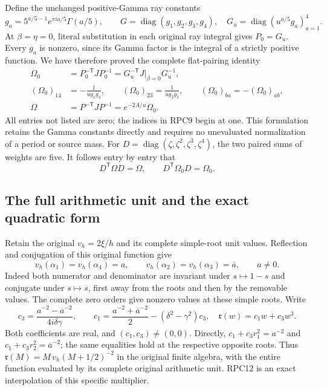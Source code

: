 \documentclass[11pt,a4paper]{article}
\begin{document}
Define the unchanged positive-Gamma ray constants
\[
 g_a=5^{a/5-1}e^{\pi ia/5}\Gamma(a/5),\qquad
 G=\operatorname{diag}(g_1,g_2,g_3,g_4),\quad
 G_u=\operatorname{diag}(u^{a/5}g_a)_{a=1}^4.
 \tag{RPC8}
\]
At $\beta=\eta=0$, literal substitution in each original ray integral
gives $P_0=G_u$. Every $g_a$ is nonzero, since its Gamma factor is
the integral of a strictly positive function. We have therefore proved
the complete flat-pairing identity
\[
 \begin{split}
 \Omega_0&=P_0^{-\mathsf T}JP_0^{-1}
       =G_u^{-\mathsf T}J\big|_{\beta=0}G_u^{-1},\\
 (\Omega_0)_{14}&=-\frac1{u g_1g_4},\qquad
 (\Omega_0)_{23}=\frac1{u g_2g_3},\qquad
 (\Omega_0)_{ba}=-(\Omega_0)_{ab},\\
 \Omega&=P^{-\mathsf T}JP^{-1}=e^{-2A/u}\Omega_0.
 \end{split}
 \tag{RPC9}
\]
All entries not listed are zero; the indices in RPC9 begin at one.
This formulation retains the Gamma constants directly and requires
no unevaluated normalization of a period or source mass. For
$D=\operatorname{diag}(\zeta,\zeta^2,\zeta^3,\zeta^4)$, the two
paired sums of weights are five. It follows entry by entry that
\[
 D^{\mathsf T}\Omega D=\Omega,
 \qquad D^{\mathsf T}\Omega_0D=\Omega_0.
 \tag{RPC10}
\]

\subsection{The full arithmetic unit and the exact quadratic form}

Retain the original $v_h=2\xi/h$ and its complete simple-root unit
values. Reflection and conjugation of this original function give
\[
 v_h(\alpha_1)=v_h(\alpha_4)=a,\qquad
 v_h(\alpha_2)=v_h(\alpha_3)=\overline a,\qquad a\ne0.
 \tag{RPC11}
\]
Indeed both numerator and denominator are invariant under $s\mapsto1-s$
and conjugate under $s\mapsto\overline s$, first away from the roots
and then by the removable values. The complete zero orders give
nonzero values at these simple roots. Write
\[
 c_3=\frac{a^{-2}-\overline a^{-2}}{4i\delta\gamma},\qquad
 c_1=\frac{a^{-2}+\overline a^{-2}}2-(\delta^2-\gamma^2)c_3,
 \quad \mathfrak r(w)=c_1w+c_3w^3.
 \tag{RPC12}
\]
Both coefficients are real, and $(c_1,c_3)\ne(0,0)$. Directly,
$c_1+c_3r_1^2=a^{-2}$ and $c_1+c_3r_2^2=\overline a^{-2}$;
the same equalities hold at the respective opposite roots. Thus
$\mathfrak r(M)=M\,v_h(M+1/2)^{-2}$ in the original finite algebra, with the
entire function evaluated by its complete original arithmetic unit.
RPC12 is an exact interpolation of this specific multiplier.
\end{document}
